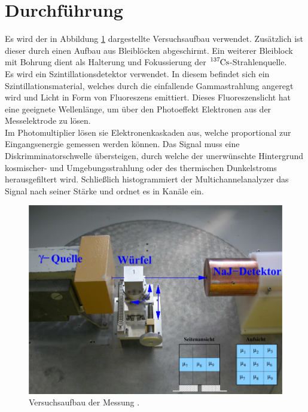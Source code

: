 \section{Durchführung}
\label{sec:Durchführung}

Es wird der in Abbildung \ref{fig:aufbau} dargestellte Versuchsaufbau verwendet. Zusätzlich
ist dieser durch einen Aufbau aus Bleiblöcken abgeschirmt. Ein weiterer Bleiblock mit Bohrung
dient als Halterung und Fokussierung der $\ce{^{137}Cs}$-Strahlenquelle.\\

Es wird ein Szintillationsdetektor verwendet. In diesem befindet sich ein Szintillationsmaterial, welches
durch die einfallende Gammastrahlung angeregt wird und Licht in Form von Fluoreszens emittiert.
Dieses Fluoreszenslicht hat eine geeignete Wellenlänge, um über den Photoeffekt Elektronen aus 
der Messelektrode zu lösen. \\

Im Photomultiplier lösen sie Elektronenkaskaden aus, welche proportional zur
Eingangsenergie gemessen werden können. Das Signal muss eine Diskrimminatorschwelle übersteigen, durch welche
der unerwünschte Hintergrund kosmischer- und Umgebungsstrahlung oder des thermischen Dunkelstroms herausgefiltert wird.
Schließlich histogrammiert der Multichannelanalyzer das Signal nach seiner Stärke und ordnet es in Kanäle ein.

\vspace{-5pt}
\begin{figure}[H]
    \centering
    \includegraphics[scale=0.3]{content/aufbau.png}
    \vspace{-10pt}
    \vspace{3pt}
    \caption{Versuchsaufbau der Messung \cite{alt}.}
    \label{fig:aufbau}
\end{figure}
\vspace{-10pt}


